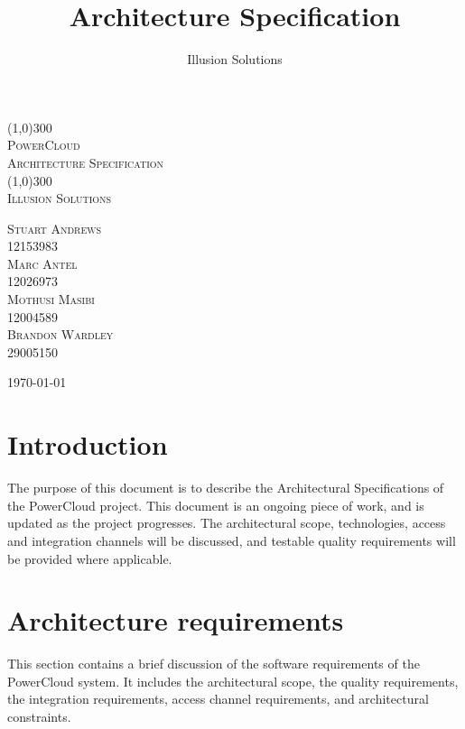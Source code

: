 \documentclass{article}
\title{
	Architecture Specification
}
\author{Illusion Solutions}
\begin{document}
	
	\begin{titlepage}
		\begin{center}
			\line(1,0){300} \\
			[0.1cm]
			\textsc{\Huge
				PowerCloud\\
				Architecture Specification
			} \\
			[0.1cm]
			\line(1,0){300} \\
			[2.0cm]
			\textsc{\Large
				Illusion Solutions
			} \\
			[3.5cm]
			
		\end{center}
		\begin{flushright}
			\textsc{\Large
				Stuart Andrews\\ 
				12153983\\
				Marc Antel\\
				12026973\\
				Mothusi Masibi\\
				12004589\\
				Brandon Wardley\\
				29005150\\
				[4.0cm]
			}
		\end{flushright}
		\begin{center}
			\today
		\end{center}
	\end{titlepage}

\newpage
\restoregeometry
\tableofcontents
\thispagestyle{empty}

\newpage

\section{Introduction}

The purpose of this document is to describe the Architectural 
Specifications of the PowerCloud project. This document is an ongoing 
piece of work, and is updated as the project progresses. The 
architectural scope, technologies, access and integration channels will 
be discussed, and testable quality requirements will be provided where 
applicable.

\section{Architecture requirements}

This section contains a brief discussion of the software requirements of 
the PowerCloud system. It includes the architectural scope, the quality 
requirements, the integration requirements, access channel requirements, 
and architectural constraints.
\end{document}
